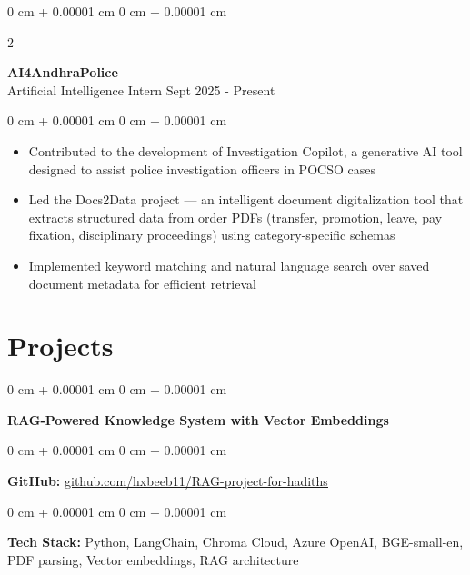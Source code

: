 \documentclass[10pt, letterpaper]{article}
\newenvironment{highlights}{
    \begin{itemize}[
        topsep=0.10 cm,
        parsep=0.10 cm,
        partopsep=0pt,
        itemsep=0pt,
        leftmargin=0 cm + 10pt
    ]
}{
    \end{itemize}
} %
\newenvironment{onecolentry}{
    \begin{adjustwidth}{
        0 cm + 0.00001 cm
    }{
        0 cm + 0.00001 cm
    }
}{
    \end{adjustwidth}
} %
\newenvironment{twocolentry}[2][]{
    \onecolentry
    \def\secondColumn{#2}
    \setcolumnwidth{\fill, 4.5 cm}
    \begin{paracol}{2}
}{
    \switchcolumn \raggedleft \secondColumn
    \end{paracol}
    \endonecolentry
} %
\let\hrefOriginal\href
\renewcommand{\href}[2]{\hrefOriginal{#1}{\uline{#2}}}
\begin{document}
    \vspace{0.10 cm}
    \begin{twocolentry}{
        Sept 2025 - Present
    }
        \textbf{AI4AndhraPolice} \\
        Artificial Intelligence Intern\end{twocolentry}

    \vspace{0.10 cm}
    \begin{onecolentry}
        \begin{highlights}
            \item Contributed to the development of Investigation Copilot, a generative AI tool designed to assist police investigation officers in POCSO cases
            \item Led the Docs2Data project — an intelligent document digitalization tool that extracts structured data from order PDFs (transfer, promotion, leave, pay fixation, disciplinary proceedings) using category-specific schemas
            \item Implemented keyword matching and natural language search over saved document metadata for efficient retrieval
        \end{highlights}
    \end{onecolentry}

    \section{Projects}
    \begin{onecolentry}
        \textbf{RAG-Powered Knowledge System with Vector Embeddings}  
    \end{onecolentry}

    \vspace{0.10 cm}

    \begin{onecolentry}
        \textbf{GitHub:} \href{https://github.com/hxbeeb11/RAG-project-for-hadiths}
        {github.com/hxbeeb11/RAG-project-for-hadiths}  
    \end{onecolentry}

    \vspace{0.10 cm}

    \begin{onecolentry}
        \textbf{Tech Stack:} Python, LangChain, Chroma Cloud, Azure OpenAI, BGE-small-en, PDF parsing, Vector embeddings, RAG architecture  
    \end{onecolentry}
\end{document}
